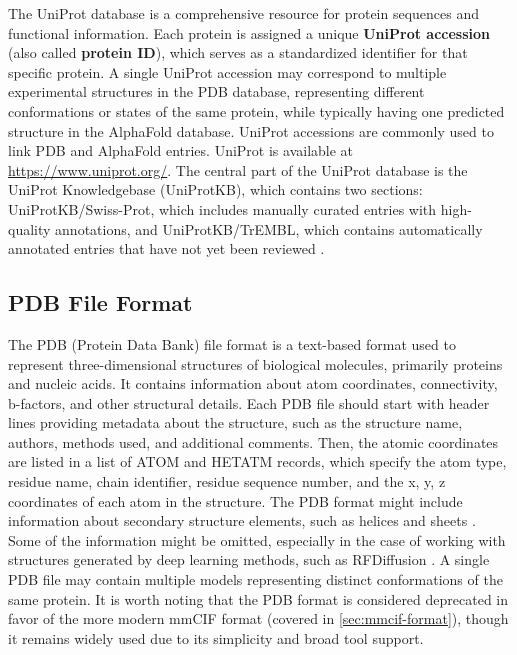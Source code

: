 The UniProt database \cite{uniprot2025uniprot} is a comprehensive resource for protein sequences and functional information. Each protein is assigned a unique \textbf{UniProt accession} (also called \textbf{protein ID}), which serves as a standardized identifier for that specific protein. A single UniProt accession may correspond to multiple experimental structures in the PDB database, representing different conformations or states of the same protein, while typically having one predicted structure in the AlphaFold database. UniProt accessions are commonly used to link PDB and AlphaFold entries. UniProt is available at \url{https://www.uniprot.org/}. The central part of the UniProt database is the UniProt Knowledgebase (UniProtKB), which contains two sections: UniProtKB/Swiss-Prot, which includes manually curated entries with high-quality annotations, and UniProtKB/TrEMBL, which contains automatically annotated entries that have not yet been reviewed \cite{boutet2016uniprotkb}.

\subsection{PDB File Format}
\label{sec:pdb-format}

The PDB (Protein Data Bank) file format is a text-based format used to represent three-dimensional structures of biological molecules, primarily proteins and nucleic acids. It contains information about atom coordinates, connectivity, b-factors, and other structural details. Each PDB file should start with header lines providing metadata about the structure, such as the structure name, authors, methods used, and additional comments. Then, the atomic coordinates are listed in a list of ATOM and HETATM records, which specify the atom type, residue name, chain identifier, residue sequence number, and the x, y, z coordinates of each atom in the structure. The PDB format might include information about secondary structure elements, such as helices and sheets \cite{westbrook2003pdb}. Some of the information might be omitted, especially in the case of working with structures generated by deep learning methods, such as RFDiffusion \cite{watson2023novo}. A single PDB file may contain multiple models representing distinct conformations of the same protein. It is worth noting that the PDB format is considered deprecated in favor of the more modern mmCIF format (covered in \ref{sec:mmcif-format}), though it remains widely used due to its simplicity and broad tool support.

